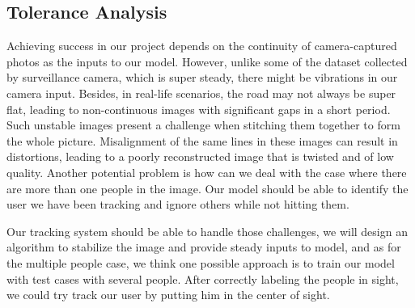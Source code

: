 \subsection{Tolerance Analysis}
Achieving success in our project depends on the continuity of camera-captured photos as the inputs to our model. However, unlike some of the dataset collected by surveillance camera, which is super steady, there might be vibrations in our camera input. Besides, in real-life scenarios, the road may not always be super flat, leading to non-continuous images with significant gaps in a short period. Such unstable images present a challenge when stitching them together to form the whole picture. Misalignment of the same lines in these images can result in distortions, leading to a poorly reconstructed image that is twisted and of low quality.
Another potential problem is how can we deal with the case where there are more than one people in the image. Our model should be able to identify the user we have been tracking and ignore others while not hitting them.

Our tracking system should be able to handle those challenges, we will design an algorithm to stabilize the image and provide steady inputs to model, and as for the multiple people case, we think one possible approach is to train our model with test cases with several people. After correctly labeling the people in sight, we could try track our user by putting him in the center of sight.
